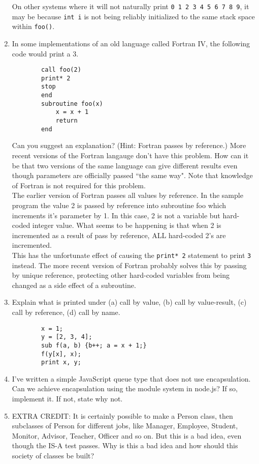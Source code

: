 \documentclass{article}
\begin{document}
\begin{enumerate}
    On other systems where it will not naturally print \texttt{0 1 2 3 4 5 6 7 8 9}, it may be because \texttt{int i} is not being reliably initialized to the same stack space within \texttt{foo()}.
    
    \setcounter{enumi}{7}
    \pagebreak
    \item In some implementations of an old language called Fortran IV, the following code would print a 3. 
    \begin{verbatim} 
        call foo(2)
        print* 2
        stop
        end
        subroutine foo(x)
            x = x + 1
            return
        end
    \end{verbatim}
    Can you suggest an explanation? (Hint: Fortran passes by reference.) More recent versions of the Fortran langauge don't have this problem. How can it be that two versions of the same language can give different results even though parameters are officially passed ``the same way". Note that knowledge of Fortran is not required for this problem.\\[.25in]
    The earlier version of Fortran passes all values by reference. In the sample program the value 2 is passed by reference into subroutine foo which increments it's parameter by 1. In this case, 2 is not a variable but hard-coded integer value. What seems to be happening is that when 2 is incremented as a result of pass by reference, ALL hard-coded 2's are incremented. \\[.1in]
    This has the unfortunate effect of causing the \texttt{print* 2} statement to print \texttt{3} instead. The more recent version of Fortran probably solves this by passing by unique reference, protecting other hard-coded variables from being changed as a side effect of a subroutine.
    \setcounter{enumi}{9}
    \pagebreak
    \item Explain what is printed under (a) call by value, (b) call by value-result, (c) call by reference, (d) call by name.
    \begin{verbatim}
        x = 1;
        y = [2, 3, 4];
        sub f(a, b) {b++; a = x + 1;}
        f(y[x], x);
        print x, y;
    \end{verbatim}
    \pagebreak
    \item I've written a simple JavaScript queue type that does not use encapsulation. Can we achieve encapsulation using the module system in node.js? If so, implement it. If not, state why not.
    \pagebreak
    \item EXTRA CREDIT: It is certainly possible to make a Person class, then subclasses of Person for different jobs, like Manager, Employee, Student, Monitor, Advisor, Teacher, Officer and so on. But this is a bad idea, even though the IS-A test passes. Why is this a bad idea and how should this society of classes be built? \\[.1in]


\end{enumerate}
\end{document}

